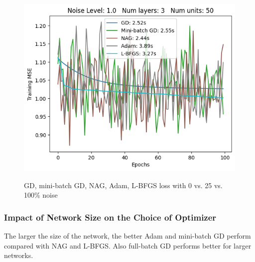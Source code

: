 \begin{figure}[h!]
    \begin{minipage}[t]{0.32\textwidth}
        \includegraphics[width=\textwidth]{figures/noise-level-1-0-num-layers-3-num-units-50.png}
        \label{fig:noise-level-1-0-num-layers-3-num-units-50}
    \end{minipage}
    \vspace{-20pt}
    \caption{GD, mini-batch GD, NAG, Adam, L-BFGS loss with 0 vs. 25 vs. 100\% noise}
\end{figure}

\subsubsection{Impact of Network Size on the Choice of Optimizer}

\vspace{-2.5pt}
The larger the size of the network, the better Adam and mini-batch GD perform
compared with NAG and L-BFGS. Also full-batch GD performs better for larger networks.
\vspace{-2.5pt}


